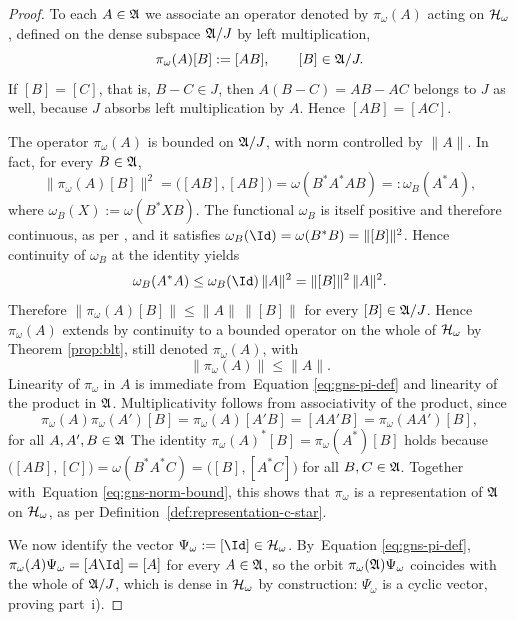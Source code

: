 \begin{proof}
	To each $A \in \mathfrak{A}$ we associate an operator denoted by $\pi_\omega(A)$ acting on $\H_\omega$, defined on the dense subspace $\mathfrak{A}/J$ by left multiplication,
	\begin{equation}
		\label{eq:gns-pi-def}
		\pi_\omega(A)[B] := [AB], \qquad [B] \in \mathfrak{A}/J.
	\end{equation}
	If $[B] = [C]$, that is, $B-C \in J$, then $A(B-C) = AB-AC$ belongs to $J$ as well, because $J$ absorbs left multiplication by $A$. Hence $[AB]=[AC]$. 
	
	The operator $\pi_\omega(A)$ is bounded on $\mathfrak{A}/J$, with norm controlled by $\|A\|$. In fact, for every $B \in \mathfrak{A}$,
	\begin{equation}
		\|\pi_\omega(A)[B]\|^2 = \big([AB],[AB]\big) = \omega(B^*A^*AB) =: \omega_B(A^*A),
	\end{equation}
	where $\omega_B(X) := \omega(B^*XB)$. The functional $\omega_B$ is itself positive and therefore continuous, as per \cite[Prop.~1.6.3, Appendix~C]{strocchiIntroductionMathematicalStructure2005}, and it satisfies $\omega_B(\Id) = \omega(B^*B) = \|[B]\|^2$. Hence continuity of $\omega_B$ at the identity yields
	\begin{equation}
		\omega_B(A^*A) \le \omega_B(\Id)\, \|A\|^2 = \|[B]\|^2\, \|A\|^2.
	\end{equation}
	Therefore $\|\pi_\omega(A)[B]\| \le \|A\|\, \|[B]\|$ for every $[B] \in \mathfrak{A}/J$. Hence $\pi_\omega(A)$ extends by continuity to a bounded operator on the whole of $\H_\omega$ by Theorem \ref{prop:blt}, still denoted $\pi_\omega(A)$, with
	\begin{equation}
		\label{eq:gns-norm-bound}
		\|\pi_\omega(A)\| \le \|A\|.
	\end{equation}
	Linearity of $\pi_\omega$ in $A$ is immediate from~Equation \eqref{eq:gns-pi-def} and linearity of the product in $\mathfrak{A}$. Multiplicativity follows from associativity of the product, since $$\pi_\omega(A)\pi_\omega(A')[B] = \pi_\omega(A)[A'B] = [AA'B] = \pi_\omega(AA')[B],$$ for all $A,A',B \in \mathfrak{A}$ The identity $\pi_\omega(A)^*[B] = \pi_\omega(A^*)[B]$ holds because $\big([AB],[C]\big) = \omega(B^*A^*C) = \big([B],[A^*C]\big)$ for all $B,C \in \mathfrak{A}$. Together with~Equation \eqref{eq:gns-norm-bound}, this shows that $\pi_\omega$ is a representation of $\mathfrak{A}$ on $\H_\omega$, as per Definition~\ref{def:representation-c-star}.
	
	We now identify the vector $\Psi_\omega := [\Id] \in \H_\omega$. By~Equation \eqref{eq:gns-pi-def}, $\pi_\omega(A)\Psi_\omega = [A\Id] = [A]$ for every $A \in \mathfrak{A}$, so the orbit $\pi_\omega(\mathfrak{A})\Psi_\omega$ coincides with the whole of $\mathfrak{A}/J$, which is dense in $\H_\omega$ by construction: $\Psi_\omega$ is a cyclic vector, proving part~i). 
	

\end{proof}
